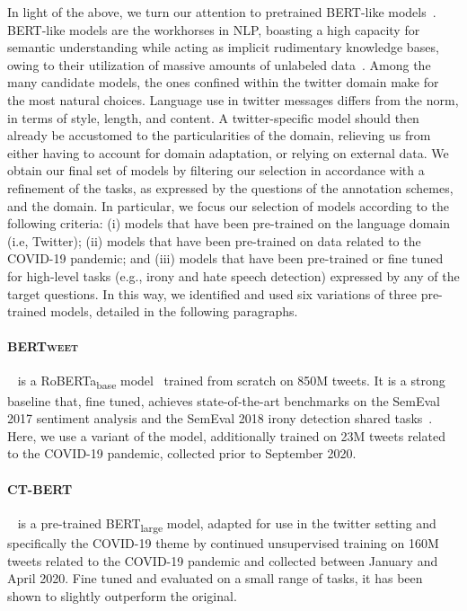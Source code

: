 \documentclass[11pt,a4paper]{article}
\begin{document}
In light of the above, we turn our attention to pretrained BERT-like models~\cite{bert}.
BERT-like models are the workhorses in NLP, boasting a high capacity for semantic understanding while acting as implicit rudimentary knowledge bases, owing to their utilization of massive amounts of unlabeled data~\cite{petroni-etal-2019-language,bertprimer}.
Among the many candidate models, the ones confined within the twitter domain make for the most natural choices. Language use in twitter messages differs from the norm, in terms of style, length, and content. A twitter-specific model should then already be accustomed to the particularities of the domain, relieving us from either having to account for domain adaptation, or relying on external data.
We obtain our final set of models by filtering our selection in accordance with a refinement of the tasks, as expressed by the questions of the annotation schemes, and the domain. In particular, we focus our selection of models according to the following criteria: (i) models that have been pre-trained on the language domain (i.e, Twitter); (ii) models that have been pre-trained on data related to the COVID-19 pandemic; and (iii) models that have been pre-trained or fine tuned for high-level tasks (e.g., irony and hate speech detection) expressed by any of the target questions. In this way, we identified and used six variations of three 
pre-trained models, detailed in the following paragraphs.

\paragraph{\textsc{BERTweet}}~\cite{vinai} is a RoBERTa\textsubscript{base} model~\cite{roberta} trained from scratch on 850M tweets. 
It is a strong baseline that, fine tuned, achieves state-of-the-art benchmarks on the SemEval 2017 sentiment analysis and the SemEval 2018 irony detection shared tasks~\cite{rosenthal-etal-2017-semeval, van-hee-etal-2018-semeval}.
Here, we use a variant of the model, additionally trained on 23M tweets related to the COVID-19 pandemic, collected prior to September 2020.


\paragraph{\textsc{CT-BERT}}~\cite{del} is a pre-trained BERT\textsubscript{large} model, adapted for use in the twitter setting and specifically the COVID-19 theme by continued unsupervised training on 160M tweets related to the COVID-19 pandemic and collected between January and April 2020.
Fine tuned and evaluated on a small range of tasks, it has been shown to slightly outperform the original.
\end{document}
